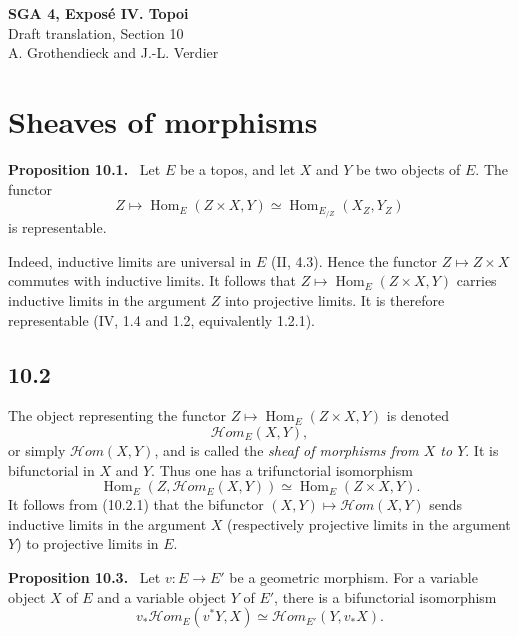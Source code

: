 \documentclass[11pt]{article}
\newcommand{\Hom}{\operatorname{Hom}}
\newcommand{\scrHom}{\mathscr{H}\!om}
\newenvironment{statement}[1]{\par\medskip\noindent\textbf{#1.}\ }{\par\medskip}
\begin{document}
\begin{center}
{\Large \textbf{SGA 4, Expos\'e IV. Topoi}}\\[0.35em]
{\large Draft translation, Section 10}\\[0.35em]
A. Grothendieck and J.-L. Verdier
\end{center}

\bigskip


\setcounter{section}{9}
\section{Sheaves of morphisms}

\begin{statement}{Proposition 10.1}
Let $E$ be a topos, and let $X$ and $Y$ be two objects of $E$. The functor
\[
Z\longmapsto \Hom_E(Z\times X,Y)\simeq \Hom_{E_{/Z}}(X_Z,Y_Z)
\]
is representable.
\end{statement}

Indeed, inductive limits are universal in $E$ (II, 4.3). Hence the functor $Z\mapsto Z\times X$ commutes with inductive limits. It follows that $Z\mapsto \Hom_E(Z\times X,Y)$ carries inductive limits in the argument $Z$ into projective limits. It is therefore representable (IV, 1.4 and 1.2, equivalently 1.2.1).

\subsection*{10.2}
The object representing the functor $Z\mapsto \Hom_E(Z\times X,Y)$ is denoted
\[
\scrHom_E(X,Y),
\]
or simply $\scrHom(X,Y)$, and is called the \emph{sheaf of morphisms from $X$ to $Y$}. It is bifunctorial in $X$ and $Y$. Thus one has a trifunctorial isomorphism
\begin{equation}
\Hom_E(Z,\scrHom_E(X,Y))\simeq \Hom_E(Z\times X,Y).\tag{10.2.1}
\end{equation}
It follows from (10.2.1) that the bifunctor $(X,Y)\mapsto \scrHom(X,Y)$ sends inductive limits in the argument $X$ (respectively projective limits in the argument $Y$) to projective limits in $E$.

\begin{statement}{Proposition 10.3}
Let $v:E\to E'$ be a geometric morphism. For a variable object $X$ of $E$ and a variable object $Y$ of $E'$, there is a bifunctorial isomorphism
\begin{equation}
v_*\scrHom_E(v^*Y,X)\simeq \scrHom_{E'}(Y,v_*X).\tag{10.3.1}
\end{equation}
\end{statement}
\end{document}
